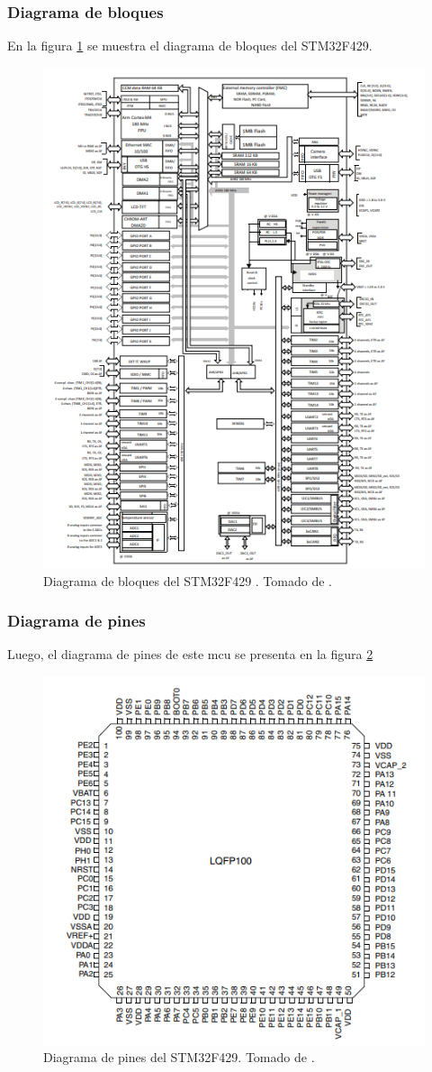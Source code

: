 \subsubsection*{Diagrama de bloques}
En la figura \ref{fig1} se muestra el diagrama de bloques del STM32F429.
\begin{figure}[H]
\centering
\includegraphics[width=.55\linewidth]{Imagenes/1.png}
 \caption{Diagrama de bloques del STM32F429 . Tomado de \cite{web}.}
 \label{fig1}
\end{figure}
\subsubsection*{Diagrama de pines}
Luego, el diagrama de pines de este mcu se presenta en la figura \ref{fig2}
\begin{figure}[H]
\centering
\includegraphics[width=.55\linewidth]{Imagenes/2.png}
 \caption{Diagrama de pines del STM32F429. Tomado de \cite{web}.}
 \label{fig2}
\end{figure}
